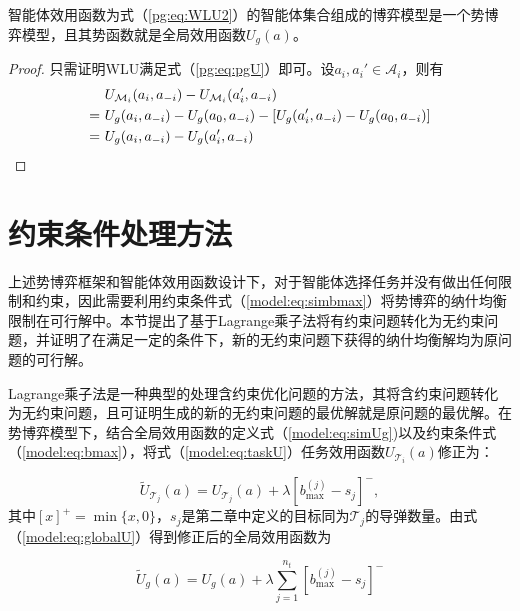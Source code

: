 \begin{proposition}[WLU可行性]
\label{pg:pro:mwlu}
	智能体效用函数为式（\ref{pg:eq:WLU2}）的智能体集合组成的博弈模型是一个势博弈模型，且其势函数就是全局效用函数$U_g(a)$。
	
	\begin{proof}
	只需证明WLU满足式（\ref{pg:eq:pgU}）即可。设$a_i,a_i' \in \mathcal{A}_i$，则有
	\begin{align}
		&\ U_{\mathcal{M}_i}(a_i,a_{-i}) - U_{\mathcal{M}_i}(a_i',a_{-i})\notag\\
		=&\ U_g(a_i,a_{-i}) - U_g(a_0,a_{-i}) - [U_g(a_i',a_{-i}) - U_g(a_0,a_{-i})]\notag\\
		=&\ U_g(a_i,a_{-i}) - U_g(a_i',a_{-i}) \notag
	\end{align}
	\end{proof}
\end{proposition}



\section{约束条件处理方法}
\label{pg:mwlu}

上述势博弈框架和智能体效用函数设计下，对于智能体选择任务并没有做出任何限制和约束，因此需要利用约束条件式（\ref{model:eq:simbmax}）将势博弈的纳什均衡限制在可行解中。本节提出了基于Lagrange乘子法将有约束问题转化为无约束问题，并证明了在满足一定的条件下，新的无约束问题下获得的纳什均衡解均为原问题的可行解。

Lagrange乘子法是一种典型的处理含约束优化问题的方法，其将含约束问题转化为无约束问题，且可证明生成的新的无约束问题的最优解就是原问题的最优解。在势博弈模型下，结合全局效用函数的定义式（\ref{model:eq:simUg})以及约束条件式（\ref{model:eq:bmax}），将式（\ref{model:eq:taskU}）任务效用函数$U_{\mathcal{T}_i}(a)$修正为：

\begin{equation}
\label{pg:eq:newTaskU}
	\widetilde U_{\mathcal{T}_j}(a) = U_{\mathcal{T}_j}(a) + \lambda [b_{\text{max}}^{(j)} - s_j]^-,
\end{equation}
其中$[x]^+=\min\{x,0\}$，$s_j$是第二章中定义的目标同为$\mathcal{T}_j$的导弹数量。由式（\ref{model:eq:globalU}）得到修正后的全局效用函数为

\begin{equation}
\label{pg:eq:newglobalU}
		\widetilde U_g(a) = U_g(a) +  \lambda \sum_{j=1}^{n_t}[b_{\text{max}}^{(j)} - s_j]^-
	\end{equation}

